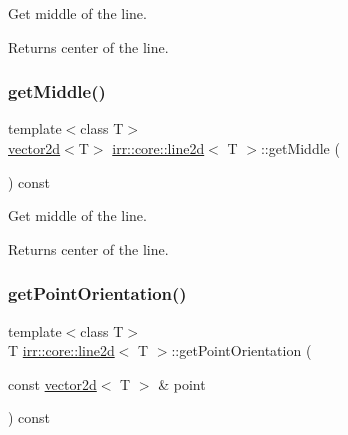 Get middle of the line. 

\begin{DoxyReturn}{Returns}
center of the line. 
\end{DoxyReturn}
\mbox{\label{classirr_1_1core_1_1line2d_a18c94540c89997e0a4acc96e08f6f4a0}} 
\subsubsection{\texorpdfstring{get\+Middle()}{getMiddle()}\hspace{0.1cm}{\footnotesize\ttfamily [2/2]}}
{\footnotesize\ttfamily template$<$class T$>$ \\
\hyperlink{classirr_1_1core_1_1vector2d}{vector2d}$<$T$>$ \hyperlink{classirr_1_1core_1_1line2d}{irr\+::core\+::line2d}$<$ T $>$\+::get\+Middle (\begin{DoxyParamCaption}{ }\end{DoxyParamCaption}) const\hspace{0.3cm}{\ttfamily [inline]}}



Get middle of the line. 

\begin{DoxyReturn}{Returns}
center of the line. 
\end{DoxyReturn}
\mbox{\label{classirr_1_1core_1_1line2d_a85405d08c6e3ea55cdb39b60484f7275}} 
\subsubsection{\texorpdfstring{get\+Point\+Orientation()}{getPointOrientation()}\hspace{0.1cm}{\footnotesize\ttfamily [1/2]}}
{\footnotesize\ttfamily template$<$class T$>$ \\
T \hyperlink{classirr_1_1core_1_1line2d}{irr\+::core\+::line2d}$<$ T $>$\+::get\+Point\+Orientation (\begin{DoxyParamCaption}\item[{const \hyperlink{classirr_1_1core_1_1vector2d}{vector2d}$<$ T $>$ \&}]{point }\end{DoxyParamCaption}) const\hspace{0.3cm}{\ttfamily [inline]}}



